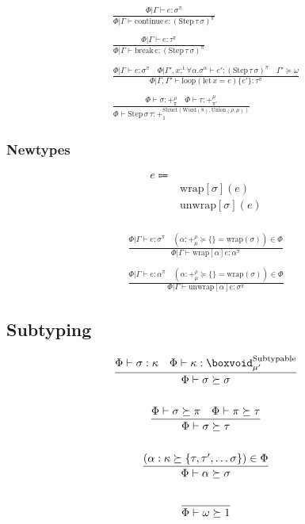 \documentclass {article}
\begin{document}
\begin{gather*}
\frac
{\Phi | \Gamma \vdash e : \sigma^\pi }
{\Phi | \Gamma \vdash \text{continue} \, e : (\text{Step} \, \tau \, \sigma)^\pi } \\
\\
\frac
{\Phi | \Gamma \vdash e : \tau^\pi }
{\Phi | \Gamma \vdash \text{break} \, e : (\text{Step} \, \tau \, \sigma)^\pi } \\
\\
\frac
{\Phi | \Gamma \vdash e : \sigma^\pi \quad \Phi | \Gamma', x :^1 \forall \alpha. \sigma^\alpha \vdash e' : (\text{Step} \, \tau \, \sigma) ^\pi \quad \Gamma' \succeq \omega }
{\Phi | \Gamma, \Gamma' \vdash \text{loop} (\text{let} \, x = e) \{ e' \} : \tau^\pi } \\
\\
\frac
{\Phi \vdash \sigma : +^{\rho}_{\pi} \quad \Phi \vdash \tau : +^{\mu}_{\pi'} }
{\Phi \vdash \text{Step} \, \sigma \, \tau : +^{\text{Struct} (\text{Word} (8), \text{Union} (\rho, \mu) ) }_1 }
\end{gather*}

\subsubsection{Newtypes}

\begin{align*}
e \Coloneqq & \\
& \text{wrap} [\sigma] (e) \\
& \text{unwrap} [\sigma] (e) \\
\end{align*}

\begin{gather*}
\frac
{\Phi | \Gamma \vdash e : \sigma^\pi \quad (\alpha : +^\rho_\mu \succeq \{\} = \text{wrap} (\sigma)) \in \Phi}
{\Phi | \Gamma \vdash \text{wrap} [\alpha] e : \alpha^\pi} \\
\\
\frac
{\Phi | \Gamma \vdash e : \alpha^\pi \quad (\alpha : +^\rho_\mu \succeq \{\} = \text{wrap} (\sigma)) \in \Phi}
{\Phi | \Gamma \vdash \text{unwrap} [\alpha] e : \sigma^\pi}
\end{gather*}

\subsection{Subtyping}
\begin{gather*}
\frac
{\Phi \vdash \sigma : \kappa \quad \Phi \vdash \kappa : \boxvoid^\text{Subtypable}_{\mu'}}
{\Phi \vdash \sigma \succeq \sigma} \\
\\
\frac
{\Phi \vdash \sigma \succeq \pi \quad \Phi \vdash \pi \succeq \tau}
{\Phi \vdash \sigma \succeq \tau} \\
\\
\frac
{(\alpha : \kappa \succeq  \{ \tau, \tau', \dots \sigma \}) \in \Phi }
{\Phi \vdash \alpha \succeq \sigma} \\
\\
\frac
{}
{\Phi \vdash \omega \succeq 1}
\end{gather*}
\end{document}

